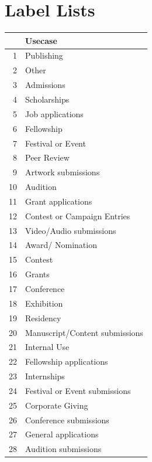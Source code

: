 \documentclass[]{report}   %
\begin{document}
\section{Label Lists}
\label{app:labels}
\begin{minipage}{0.5\textwidth}
\centering
\begin{tabular}{rl}
  \hline
 & Usecase \\ 
  \hline
1 & Publishing \\ 
  2 & Other \\ 
  3 & Admissions \\ 
  4 & Scholarships \\ 
  5 & Job applications \\ 
  6 & Fellowship \\ 
  7 & Festival or Event \\ 
  8 & Peer Review \\ 
  9 & Artwork submissions \\ 
  10 & Audition \\ 
  11 & Grant applications \\ 
  12 & Contest or Campaign Entries \\ 
  13 & Video/Audio submissions \\ 
  14 & Award/ Nomination \\ 
  15 & Contest \\ 
  16 & Grants \\ 
  17 & Conference \\ 
  18 & Exhibition \\ 
  19 & Residency \\ 
  20 & Manuscript/Content submissions \\ 
  21 & Internal Use \\ 
  22 & Fellowship applications \\ 
  23 & Internships \\ 
  24 & Festival or Event submissions \\ 
  25 & Corporate Giving \\ 
  26 & Conference submissions \\ 
  27 & General applications \\ 
  28 & Audition submissions \\ 
   \hline
\end{tabular}
\end{minipage}
\newpage
\end{document}
